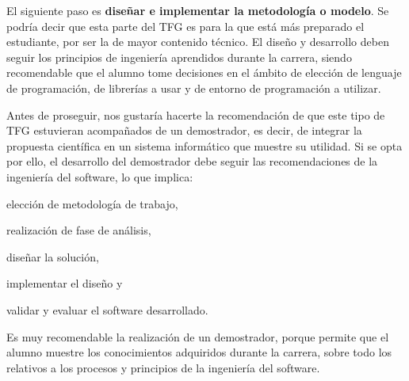 El siguiente paso es \textbf{diseñar e implementar la metodología o modelo}. Se podría decir que esta parte del TFG es para la que está más preparado el estudiante, por ser la de mayor contenido técnico. El diseño y desarrollo deben seguir los principios de ingeniería aprendidos durante la carrera, siendo recomendable que el alumno tome decisiones en el ámbito de elección de lenguaje de programación, de librerías a usar y de entorno de programación a utilizar.

Antes de proseguir, nos gustaría hacerte la recomendación de que este tipo de TFG estuvieran acompañados de un demostrador, es decir, de integrar la propuesta científica en un sistema informático que muestre su utilidad. Si se opta por ello, el desarrollo del demostrador debe seguir las recomendaciones de la ingeniería del software, lo que implica: \begin{enumerate*}[label=(\arabic*)]\item elección de metodología de trabajo, \item realización de fase de análisis, \item diseñar la solución, \item implementar el diseño y \item validar y evaluar el software desarrollado.\end{enumerate*} Es muy recomendable la realización de un demostrador, porque permite que el alumno muestre los conocimientos adquiridos durante la carrera, sobre todo los relativos a los procesos y principios de la ingeniería del software.

